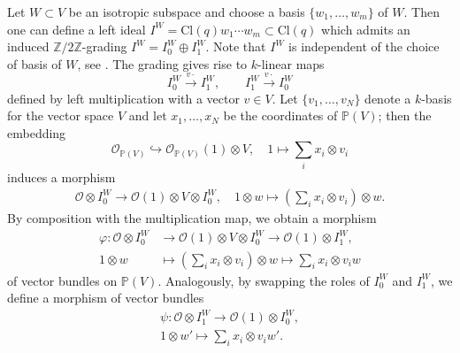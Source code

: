 \documentclass[a4paper, twoside, 11pt]{amsart}
\theoremstyle{definition}
\theoremstyle{remark}
\numberwithin{equation}{theorem}
\newcommand{\cl}{\mathrm{Cl}}
\begin{document}
Let $W \subset V$ be an isotropic subspace and choose a basis $\{w_1,\dots, w_m\}$ of $W$. Then one can define a left ideal $I^W = \cl(q)w_1 \cdots w_m \subset \cl(q)$ which admits an induced $\mathbb{Z}/2\mathbb{Z}$-grading $I^W = I^W_{0} \oplus I^W_{1}$. Note that $I^W$ is independent of the choice of basis of $W$, see \cite[§2]{Addington}. The grading gives rise to $k$-linear maps 
\begin{equation}\label{multiplication}
    I^W_{0} \overset{v\cdot}{\longrightarrow} I^W_{1}, \quad \quad I^W_{1} \overset{v\cdot}{\longrightarrow} I^W_{0}
\end{equation}
defined by left multiplication with a vector $v\in V$. Let $\{v_1,\dots,v_{N}\}$ denote a $k$-basis for the vector space $V$ 
and let $x_1,\dots,x_{N}$ be the coordinates of $\mathbb{P}(V)$; then the embedding 
\begin{equation*}
    \mathcal{O}_{\mathbb{P}(V)} \hookrightarrow \mathcal{O}_{\mathbb{P}(V)}(1) \otimes V, \quad 1 \mapsto \sum_i x_i \otimes v_i
\end{equation*} 
induces a morphism
\begin{equation*}
\begin{aligned}
    \mathcal{O}\otimes I_0^W \longrightarrow \mathcal{O}(1) \otimes V \otimes I_0^W, \quad 1\otimes w \longmapsto (\sum_ix_i\otimes v_i) \otimes w. 
\end{aligned}
\end{equation*}
By composition with the multiplication map, we obtain a morphism 
\begin{equation*}
\begin{aligned}
    \varphi\colon \mathcal{O}\otimes I_0^W &\longrightarrow \mathcal{O}(1) \otimes V \otimes I_0^W  \longrightarrow \mathcal{O}(1) \otimes I_1^W,  \\
    1\otimes w &\longmapsto (\sum_ix_i\otimes v_i) \otimes w \longmapsto \sum_i x_i \otimes v_iw
\end{aligned}
\end{equation*}
of vector bundles on $\mathbb{P}(V)$. Analogously, by swapping the roles of $I_0^W$ and $I_1^W$, we define a morphism of vector bundles
\begin{equation*}
\begin{aligned}
    \psi\colon \mathcal{O}\otimes I_1^W \longrightarrow \mathcal{O}(1) \otimes I_0^W,  \\
    1\otimes w' \longmapsto \sum_i x_i \otimes v_iw'.
\end{aligned}
\end{equation*}
\end{document}
